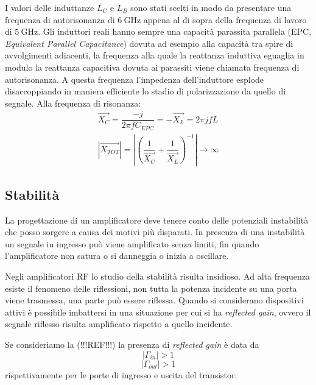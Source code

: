 \documentclass[12pt]{article}
\begin{document}
I valori delle induttanze $L_C$ e $L_B$ sono stati scelti in modo da presentare una frequenza di autorisonanza di $\SI{6}{\giga\hertz}$ appena al di sopra della frequenza di lavoro di $\SI{5}{\giga\hertz}$. Gli induttori reali hanno sempre una capacità parassita parallela (EPC, \textit{Equivalent Parallel Capacitance}) dovuta ad esempio alla capacità tra spire di avvolgimenti adiacenti, la frequenza alla quale la reattanza induttiva eguaglia in modulo la reattanza capacitiva dovuta ai parassiti viene chiamata frequenza di autorisonanza. A questa frequenza l'impedenza dell'induttore esplode disaccoppiando in maniera efficiente lo stadio di polarizzazione da quello di segnale.
Alla frequenza di risonanza:
\begin{equation}
    \begin{split}
        \vec{X_C}=\dfrac{-j}{2\pi f C_{EPC}}=-\vec{X_L}=2 \pi j f L\\
        \left|\vec{X_{TOT}}\right|=\left|\left(\dfrac{1}{\vec{X_C}}+\dfrac{1}{\vec{X_L}}\right)^{-1}\right|\to\infty 
    \end{split}
\end{equation} 

\subsection{Stabilità}
La progettazione di un amplificatore deve tenere conto delle potenziali instabilità che posso sorgere a causa dei motivi più disparati. In presenza di una instabilità un segnale in ingresso può viene amplificato senza limiti, fin quando l'amplificatore non satura o si danneggia o inizia a oscillare.

Negli amplificatori RF lo studio della stabilità risulta insidioso. Ad alta frequenza esiste il fenomeno delle riflessioni, non tutta la potenza incidente su una porta viene trasmessa, una parte può essere riflessa. Quando si considerano dispositivi attivi è possibile imbattersi in una situazione per cui si ha \textit{reflected gain}, ovvero il segnale riflesso risulta amplificato rispetto a quello incidente.

Se consideriamo la (!!!REF!!!) la presenza di \textit{reflected gain} è data da
\begin{equation}
    \left|\Gamma_{in}\right| > 1
\end{equation}
\begin{equation}
    \left|\Gamma_{out}\right| > 1
\end{equation}
rispettivamente per le porte di ingresso e uscita del transistor.
\end{document}
